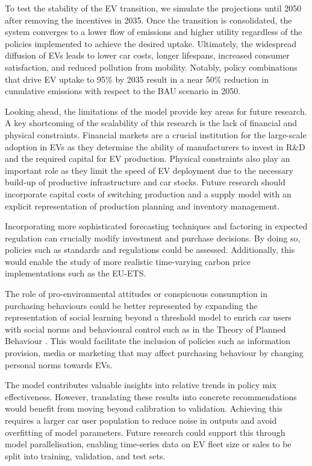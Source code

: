 \documentclass[12pt]{article}
\begin{document}
	To test the stability of the EV transition, we simulate the projections until 2050 after removing the incentives in 2035. Once the transition is consolidated, the system converges to a lower flow of emissions and higher utility regardless of the policies implemented to achieve the desired uptake. Ultimately, the widespread diffusion of EVs leads to lower car costs, longer lifespans, increased consumer satisfaction, and reduced pollution from mobility. Notably, policy combinations that drive EV uptake to 95\% by 2035 result in a near 50\% reduction in cumulative emissions with respect to the BAU scenario in 2050.


	Looking ahead, the limitations of the model provide key areas for future research. A key shortcoming of the scalability of this research is the lack of financial and physical constraints. Financial markets are a crucial institution for the large-scale adoption in EVs as they determine the ability of manufacturers to invest in R\&D and the required capital for EV production. Physical constraints also play an important role as they limit the speed of EV deployment due to the necessary build-up of productive infrastructure and car stocks. Future research should incorporate capital costs of switching production and a supply model with an explicit representation of production planning and inventory management.

    Incorporating more sophisticated forecasting techniques and factoring in expected regulation can crucially modify investment and purchase decisions. By doing so, policies such as standards and regulations could be assessed. Additionally, this would enable the study of more realistic time-varying carbon price implementations such as the EU-ETS.

    The role of pro-environmental attitudes or conspicuous consumption in purchasing behaviours could be better represented by expanding the representation of social learning beyond a threshold model to enrich car users with social norms and behavioural control such as in the Theory of Planned Behaviour \citep{ajzen1991theory}. This would facilitate the inclusion of policies such as information provision, media \citep{eppstein2011agent} or marketing that may affect purchasing behaviour by changing personal norms towards EVs.

    The model contributes valuable insights into relative trends in policy mix effectiveness. However, translating these results into concrete recommendations would benefit from moving beyond calibration to validation. Achieving this requires a larger car user population to reduce noise in outputs and avoid overfitting of model parameters. Future research could support this through model parallelisation, enabling time-series data on EV fleet size or sales to be split into training, validation, and test sets.
\end{document}
